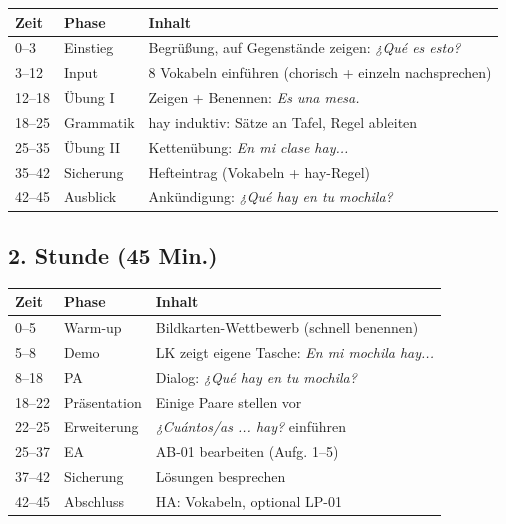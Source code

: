 \documentclass[11pt,a4paper]{article}
\begin{document}
\begin{tabular}{|p{1.2cm}|p{2.5cm}|p{9cm}|}
\hline
\textbf{Zeit} & \textbf{Phase} & \textbf{Inhalt} \\
\hline
0--3 & Einstieg & Begrüßung, auf Gegenstände zeigen: \textit{¿Qué es esto?} \\
\hline
3--12 & Input & 8 Vokabeln einführen (chorisch + einzeln nachsprechen) \\
\hline
12--18 & Übung I & Zeigen + Benennen: \textit{Es una mesa.} \\
\hline
18--25 & Grammatik & hay induktiv: Sätze an Tafel, Regel ableiten \\
\hline
25--35 & Übung II & Kettenübung: \textit{En mi clase hay...} \\
\hline
35--42 & Sicherung & Hefteintrag (Vokabeln + hay-Regel) \\
\hline
42--45 & Ausblick & Ankündigung: \textit{¿Qué hay en tu mochila?} \\
\hline
\end{tabular}

\subsection*{2. Stunde (45 Min.)}

\begin{tabular}{|p{1.2cm}|p{2.5cm}|p{9cm}|}
\hline
\textbf{Zeit} & \textbf{Phase} & \textbf{Inhalt} \\
\hline
0--5 & Warm-up & Bildkarten-Wettbewerb (schnell benennen) \\
\hline
5--8 & Demo & LK zeigt eigene Tasche: \textit{En mi mochila hay...} \\
\hline
8--18 & PA & Dialog: \textit{¿Qué hay en tu mochila?} \\
\hline
18--22 & Präsentation & Einige Paare stellen vor \\
\hline
22--25 & Erweiterung & \textit{¿Cuántos/as ... hay?} einführen \\
\hline
25--37 & EA & AB-01 bearbeiten (Aufg. 1--5) \\
\hline
37--42 & Sicherung & Lösungen besprechen \\
\hline
42--45 & Abschluss & HA: Vokabeln, optional LP-01 \\
\hline
\end{tabular}

\vspace{0.5cm}

\end{document}
